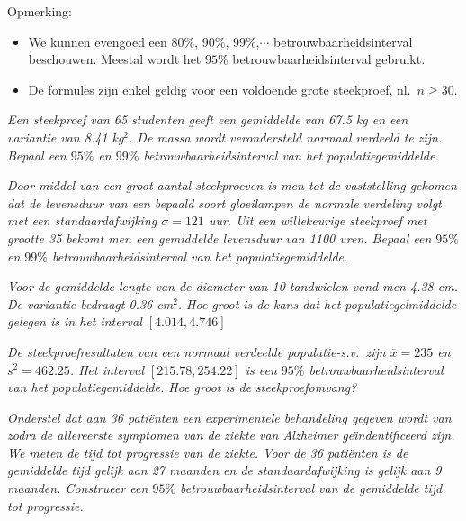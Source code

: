 {{\sc Opmerking:} 
\begin{itemize}
\item We kunnen evengoed een $80\%$, $90\%$, $99\%$,$\cdots$ betrouwbaarheidsinterval beschouwen. Meestal wordt het $95\%$ betrouwbaarheidsinterval gebruikt.
\item De formules zijn enkel geldig voor een voldoende grote steekproef, nl.\ $n\geq30$.
\end{itemize}

{\footnotesize
\begin{Opgave}\label{btrint1}
\em Een steekproef van 65 studenten geeft een gemiddelde van 67.5\; kg en een variantie van 8.41\; kg$^2$. De massa wordt verondersteld normaal verdeeld te zijn. Bepaal een $95\%$ en $99\%$ betrouwbaarheidsinterval van het populatiegemiddelde.
\end{Opgave}
\begin{opgave}\label{btrint2}
\em Door middel van een groot aantal steekproeven is men tot de vaststelling gekomen dat de levensduur van een bepaald soort gloeilampen de normale verdeling volgt met een standaardafwijking $\sigma=121$ uur. Uit een willekeurige steekproef met grootte 35 bekomt men een gemiddelde levensduur van 1100 uren. Bepaal een $95\%$ en $99\%$ betrouwbaarheidsinterval van het populatiegemiddelde.
\end{opgave}
\begin{opgave}\label{btrint3}
\em Voor de gemiddelde lengte van de diameter van 10 tandwielen vond men 4.38\; cm. De variantie bedraagt 0.36 \; cm$^2$. Hoe groot is de kans dat
 het populatiegelmiddelde gelegen is in het interval $[4.014, 4.746]$
\end{opgave}
\begin{opgave}\label{btrint4}
\em De steekproefresultaten van een normaal verdeelde populatie-s.v.\ zijn $\overline{x}=235$ en $s^2=462.25$. Het interval $[215.78,254.22]$ is een $95\%$  betrouwbaarheidsinterval van het populatiegemiddelde. Hoe groot is de steekproefomvang?
\end{opgave}
\begin{opgave}\label{btrint5}
\em Onderstel dat aan 36 pati\"enten een experimentele behandeling gegeven wordt van zodra de allereerste symptomen van de ziekte van Alzheimer ge\"\i ndentificeerd zijn. We meten de tijd tot progressie van de ziekte. Voor de 36 pati\"enten is de gemiddelde tijd gelijk aan 27 maanden en de standaardafwijking is gelijk aan 9 maanden. Construeer een $95\%$  betrouwbaarheidsinterval van de gemiddelde tijd tot progressie.
\end{opgave}

}}
